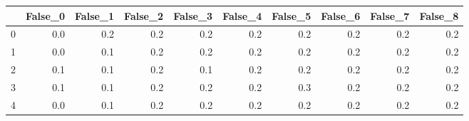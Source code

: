 \begin{tabular}{lrrrrrrrrr}
\toprule
{} &  False\_0 &  False\_1 &  False\_2 &  False\_3 &  False\_4 &  False\_5 &  False\_6 &  False\_7 &  False\_8 \\ \hline
\midrule
0 &      0.0 &      0.2 &      0.2 &      0.2 &      0.2 &      0.2 &      0.2 &      0.2 &      0.2 \\ \hline
1 &      0.0 &      0.1 &      0.2 &      0.2 &      0.2 &      0.2 &      0.2 &      0.2 &      0.2 \\ \hline
2 &      0.1 &      0.1 &      0.2 &      0.1 &      0.2 &      0.2 &      0.2 &      0.2 &      0.2 \\ \hline
3 &      0.1 &      0.1 &      0.2 &      0.2 &      0.2 &      0.3 &      0.2 &      0.2 &      0.2 \\ \hline
4 &      0.0 &      0.1 &      0.2 &      0.2 &      0.2 &      0.2 &      0.2 &      0.2 &      0.2 \\ \hline
\bottomrule
\end{tabular}
